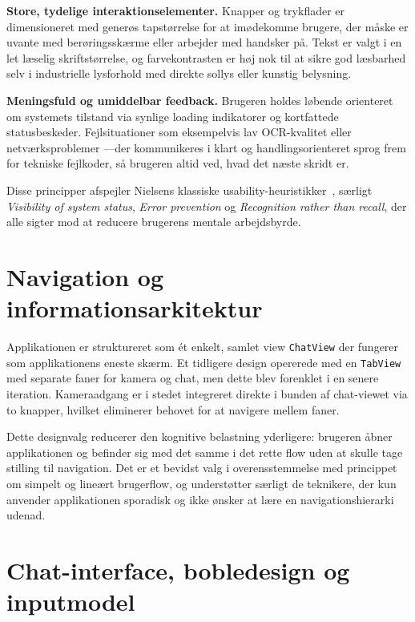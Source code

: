 \textbf{Store, tydelige interaktionselementer.} Knapper og trykflader er dimensioneret med generøs tapstørrelse for at imødekomme brugere, der måske er uvante med berøringsskærme eller arbejder med handsker på. Tekst er valgt i en let læselig skriftstørrelse, og farvekontrasten er høj nok til at sikre god læsbarhed selv i industrielle lysforhold med direkte sollys eller kunstig belysning.

\textbf{Meningsfuld og umiddelbar feedback.} Brugeren holdes løbende orienteret om systemets tilstand via synlige loading indikatorer og kortfattede statusbeskeder. Fejlsituationer som eksempelvis lav OCR-kvalitet eller netværksproblemer —der kommunikeres i klart og handlingsorienteret sprog frem for tekniske fejlkoder, så brugeren altid ved, hvad det næste skridt er.

Disse principper afspejler Nielsens klassiske usability-heuristikker~\cite{nielsen_heuristics}, særligt \textit{Visibility of system status}, \textit{Error prevention} og \textit{Recognition rather than recall}, der alle sigter mod at reducere brugerens mentale arbejdsbyrde.

\section{Navigation og informationsarkitektur}
\label{sec:navigation}

Applikationen er struktureret som ét enkelt, samlet view \texttt{ChatView} der fungerer som applikationens eneste skærm. Et tidligere design opererede med en \texttt{TabView} med separate faner for kamera og chat, men dette blev forenklet i en senere iteration. Kameraadgang er i stedet integreret direkte i bunden af chat-viewet via to knapper, hvilket eliminerer behovet for at navigere mellem faner.

Dette designvalg reducerer den kognitive belastning yderligere: brugeren åbner applikationen og befinder sig med det samme i det rette flow uden at skulle tage stilling til navigation. Det er et bevidst valg i overensstemmelse med princippet om simpelt og lineært brugerflow, og understøtter særligt de teknikere, der kun anvender applikationen sporadisk og ikke ønsker at lære en navigationshierarki udenad.

\section{Chat-interface, bobledesign og inputmodel}
\label{sec:chatdesign}

